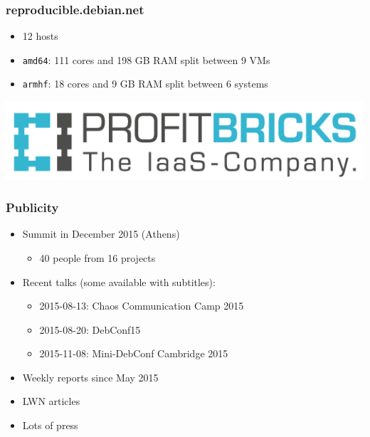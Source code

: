 \documentclass[14pt,aspectratio=169]{beamer}
\begin{document}
\begin{frame}
 \frametitle{reproducible.debian.net}
 \begin{itemize}
  \item 12 hosts
  \item \texttt{amd64}: 111 cores and 198 GB RAM split between 9 VMs
  \item \texttt{armhf}: 18 cores and 9 GB RAM split between 6 systems
 \end{itemize}
 \begin{center}
  \includegraphics[height=0.2\paperheight]{images/profitbricks_logo.png}
  \vfill
 \end{center}
\end{frame}


\begin{frame}
 \frametitle{Publicity}
 \begin{itemize}
  \item Summit in December 2015 (Athens)
   \begin{itemize}
    \item 40 people from 16 projects
   \end{itemize}
  \item Recent talks (some available with subtitles):
   \begin{itemize}
    \item 2015-08-13: Chaos Communication Camp 2015
    \item 2015-08-20: DebConf15
    \item 2015-11-08: Mini-DebConf Cambridge 2015
   \end{itemize}
  \item Weekly reports since May 2015
  \item LWN articles
  \item Lots of press
 \end{itemize}
\end{frame}
\end{document}
